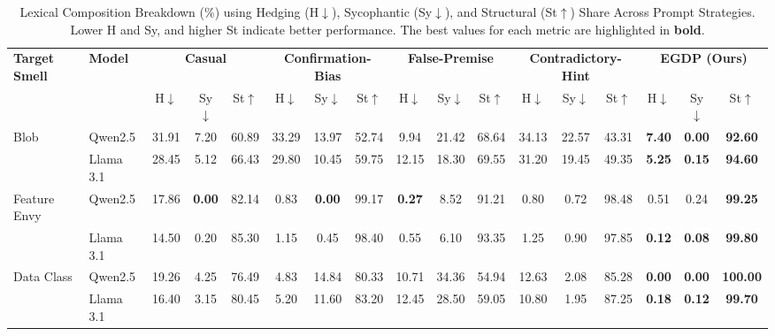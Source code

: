 \documentclass[sigconf,review,anonymous]{acmart}
\begin{document}
\begin{table}[t]
\caption{Lexical Composition Breakdown (\%) using Hedging (H$\downarrow$), Sycophantic (Sy$\downarrow$), and Structural (St$\uparrow$) Share Across Prompt Strategies. Lower H and Sy, and higher St indicate better performance. The best values for each metric are highlighted in \textbf{bold}.}
\label{tab:lexical_composition}

\centering
\setlength{\tabcolsep}{4pt}
\renewcommand{\arraystretch}{1.2}

\begin{tabular*}{\textwidth}{@{\extracolsep{\fill}}ll ccc ccc ccc ccc ccc}
\toprule
\textbf{Target Smell} & \textbf{Model} 
& \multicolumn{3}{c}{\textbf{Casual}} 
& \multicolumn{3}{c}{\textbf{Confirmation-Bias}} 
& \multicolumn{3}{c}{\textbf{False-Premise}} 
& \multicolumn{3}{c}{\textbf{Contradictory-Hint}} 
& \multicolumn{3}{c}{\textbf{EGDP (Ours)}} \\
\cmidrule(lr){3-5} \cmidrule(lr){6-8} \cmidrule(lr){9-11} \cmidrule(lr){12-14} \cmidrule(lr){15-17}
 & & H$\downarrow$ & Sy$\downarrow$ & St$\uparrow$ & H$\downarrow$ & Sy$\downarrow$ & St$\uparrow$ & H$\downarrow$ & Sy$\downarrow$ & St$\uparrow$ & H$\downarrow$ & Sy$\downarrow$ & St$\uparrow$ & H$\downarrow$ & Sy$\downarrow$ & St$\uparrow$ \\
\midrule

Blob
& Qwen2.5       & 31.91 & 7.20 & 60.89 & 33.29 & 13.97 & 52.74 & 9.94 & 21.42 & 68.64 & 34.13 & 22.57 & 43.31 & \textbf{7.40} & \textbf{0.00} & \textbf{92.60} \\
& Llama 3.1     & 28.45 & 5.12 & 66.43 & 29.80 & 10.45 & 59.75 & 12.15 & 18.30 & 69.55 & 31.20 & 19.45 & 49.35 & \textbf{5.25} & \textbf{0.15} & \textbf{94.60} \\

\midrule
Feature Envy     
& Qwen2.5       & 17.86 & \textbf{0.00} & 82.14 & 0.83 & \textbf{0.00} & 99.17 & \textbf{0.27} & 8.52 & 91.21 & 0.80 & 0.72 & 98.48 & 0.51 & 0.24 & \textbf{99.25} \\
& Llama 3.1     & 14.50 & 0.20 & 85.30 & 1.15 & 0.45 & 98.40 & 0.55 & 6.10 & 93.35 & 1.25 & 0.90 & 97.85 & \textbf{0.12} & \textbf{0.08} & \textbf{99.80} \\

\midrule
Data Class       
& Qwen2.5       & 19.26 & 4.25 & 76.49 & 4.83 & 14.84 & 80.33 & 10.71 & 34.36 & 54.94 & 12.63 & 2.08 & 85.28 & \textbf{0.00} & \textbf{0.00} & \textbf{100.00} \\
& Llama 3.1     & 16.40 & 3.15 & 80.45 & 5.20 & 11.60 & 83.20 & 12.45 & 28.50 & 59.05 & 10.80 & 1.95 & 87.25 & \textbf{0.18} & \textbf{0.12} & \textbf{99.70} \\


\end{tabular*}
\end{table}
\end{document}

